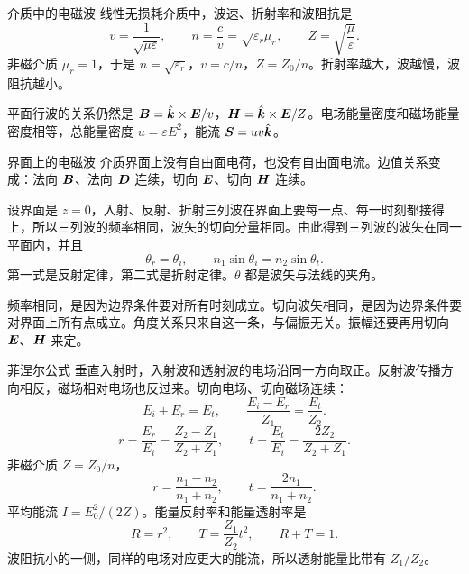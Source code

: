 \begin{frame}{介质中的电磁波}
线性无损耗介质中，波速、折射率和波阻抗是
\[
 v=\frac{1}{\sqrt{\mu\varepsilon}},\qquad
 n=\frac{c}{v}=\sqrt{\varepsilon_r\mu_r},\qquad
 Z=\sqrt{\frac{\mu}{\varepsilon}}.
\]
非磁介质 $\mu_r=1$，于是 $n=\sqrt{\varepsilon_r}$，$v=c/n$，$Z=Z_0/n$。折射率越大，波越慢，波阻抗越小。

平面行波的关系仍然是 $\bm{B}=\hat{\bm{k}}\times\bm{E}/v$，$\bm{H}=\hat{\bm{k}}\times\bm{E}/Z$。电场能量密度和磁场能量密度相等，总能量密度 $u=\varepsilon E^2$，能流 $\bm{S}=uv\hat{\bm{k}}$。

\end{frame}

\begin{frame}{界面上的电磁波}
介质界面上没有自由面电荷，也没有自由面电流。边值关系变成：法向 $\bm{B}$、法向 $\bm{D}$ 连续，切向 $\bm{E}$、切向 $\bm{H}$ 连续。

设界面是 $z=0$，入射、反射、折射三列波在界面上要每一点、每一时刻都接得上，所以三列波的频率相同，波矢的切向分量相同。由此得到三列波的波矢在同一平面内，并且
\[
 \theta_r=\theta_i,\qquad
 n_1\sin\theta_i=n_2\sin\theta_t.
\]
第一式是反射定律，第二式是折射定律。$\theta$ 都是波矢与法线的夹角。

频率相同，是因为边界条件要对所有时刻成立。切向波矢相同，是因为边界条件要对界面上所有点成立。角度关系只来自这一条，与偏振无关。振幅还要再用切向 $\bm{E}$、$\bm{H}$ 来定。
\end{frame}

\begin{frame}{菲涅尔公式}
垂直入射时，入射波和透射波的电场沿同一方向取正。反射波传播方向相反，磁场相对电场也反过来。切向电场、切向磁场连续：
\[
 E_i+E_r=E_t,\qquad
 \frac{E_i-E_r}{Z_1}=\frac{E_t}{Z_2}.
\]
\[
 \boxed{r=\frac{E_r}{E_i}=\frac{Z_2-Z_1}{Z_2+Z_1}},
 \qquad
 \boxed{t=\frac{E_t}{E_i}=\frac{2Z_2}{Z_2+Z_1}}.
\]
非磁介质 $Z=Z_0/n$，
\[
 r=\frac{n_1-n_2}{n_1+n_2},\qquad
 t=\frac{2n_1}{n_1+n_2}.
\]
平均能流 $I=E_0^2/(2Z)$。能量反射率和能量透射率是
\[
 R=r^2,\qquad
 T=\frac{Z_1}{Z_2}t^2,\qquad R+T=1.
\]
波阻抗小的一侧，同样的电场对应更大的能流，所以透射能量比带有 $Z_1/Z_2$。
\end{frame}

